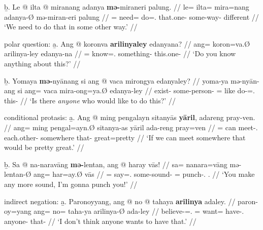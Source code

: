 	\b{b.} \begingl
		\gla Le @ ilta @ miranang adanya \textbf{mə-}miraneri 
			palung. //
		\glb le= ilta= mira=nang adanya-Ø mə-miran-eri palung //
		\glc \PatTI{}= need= do=\Fsg{}.\Aarg{} that.one-\Top{} 
			some-way-\Ins{} different //
		\glft `We need to do that in some other way.' //
		\endgl
	\endsubsub

\a polar question:\vspace{.5em} %
	\beginsubsub
	\b{a.} \begingl
		\gla Ang @ koronva \textbf{arilinyaley} edanyana? //
		\glb ang= koron=va.Ø arilinya-ley edanya-na //
		\glc \AgtT{}= know=\Second{}.\Top{} something-\PargI{} 
			this.one-\Gen{} //
		\glft `Do you know anything about this?' //
		\endgl\vspace{.5em}
		
	\b{b.} \begingl
		\gla Yomaya \textbf{mə-}nyānang si ang @ vaca mirongya 
			edanyaley? //
		\glb yoma-ya mə-nyān-ang si ang= vaca mira-ong=ya.Ø
			edanya-ley //
		\glc exist-\TsgM{} some-person-\Aarg{} \Rel{} \AgtT{}= 
			like do-\Irr{}=\TsgM{}.\Top{} this-\PargI{} //
		\glft `Is there \emph{anyone} who would like to do this?' //
		\endgl
	\endsubsub

\a conditional protasis:\vspace{.5em} %
	\beginsubsub
	\b{a.} \begingl
		\gla Ang @ ming pengalayn sitanyās \textbf{yāril}, adareng 
			pray-ven. //
		\glb ang= ming pengal=ayn.Ø sitanya-as yāril ada-reng 
			pray=ven //
		\glc \AgtT{}= can meet-\Fpl{}.\Top{} each.other-\Parg{} 
			somewhere that-\AargI{} great=pretty //
		\glft `If we can meet somewhere that would be pretty great.' //
		\endgl\vspace{.5em}
		
	\b{b.} \begingl
		\gla Sa @ na-naravāng \textbf{mə-}lentan, ang @ haray vās! //
		\glb sa= na\til{}nara=vāng mə-lentan-Ø ang= har=ay.Ø vās //
		\glc \PatT{}= \Iter{}\til{}say=\Second{}.\Aarg{} some-sound-\Top{} 
			\AgtT{}= punch-\Fsg{}.\Top{} \Second{}.\Parg{} //
		\glft `You make any more sound, I'm gonna punch you!' //
		\endgl
	\endsubsub

\a indirect negation:\vspace{.5em} %
	\beginsubsub
	\b{a.} \begingl
		\gla Paronoyyang, ang @ no @ tahaya \textbf{arilinya} adaley. //
		\glb paron-oy=yang ang= no= taha-ya arilinya-Ø ada-ley //
		\glc believe-\Neg{}=\Fsg{}.\Aarg{} \AgtT{}= want= 
			have-\Tsg{}.\M{} anyone-\Top{} that-\PargI{} //
		\glft `I don't think anyone wants to have that.' //
		\endgl\vspace{.5em}
	
